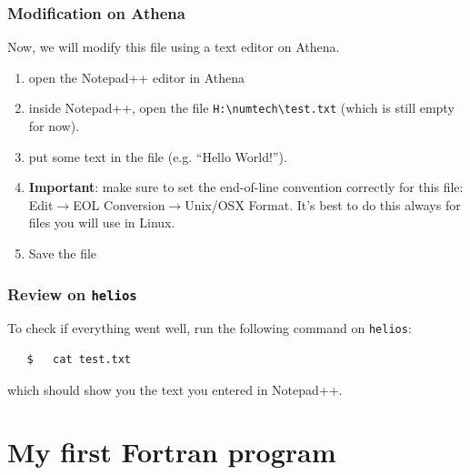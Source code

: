 \documentclass[a4paper]{article}
\begin{document}
\subsubsection{Modification on Athena\label{sec:txtmodif}}
%
\par
Now, we will modify this file using a text editor on Athena. 
%
\begin{enumerate}
	\item open the {Notepad++} editor in Athena
	\item inside {Notepad++}, open the file \verb+H:\numtech\test.txt+ (which is still empty for now).
	\item put some text in the file (e.g. ``Hello World!'').
	\item \textbf{Important}: make sure to set the end-of-line convention correctly for this file:\\ Edit$\rightarrow$EOL Conversion$\rightarrow$Unix/OSX Format. It's best to do this always for files you will use in Linux.
	\item Save the file
\end{enumerate}
%
\subsubsection{Review on \texttt{helios}}
%
\par
To check if everything went well, run the following command on \texttt{helios}:
%
\begin{verbatim}
   $   cat test.txt
\end{verbatim}
%
which should show you the text you entered in {Notepad++}.
%
\section{My first Fortran program}
%
\end{document}
